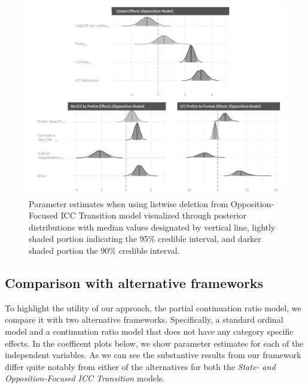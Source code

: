 \begin{figure}
    \centering
    \includegraphics[width=1\textwidth]{rebelCoefSumm_noImp.pdf}
    \caption{Parameter estimates when using listwise deletion from Opposition-Focused ICC Transition model visualized through posterior distributions with median values designated by vertical line, lightly shaded portion indicating the 95\% credible interval, and darker shaded portion the 90\% credible interval.}
    \label{fig:rebelModel_noImp}
\end{figure}

\FloatBarrier
\clearpage
\subsection*{Comparison with alternative frameworks}

To highlight the utility of our approach, the partial continuation ratio model, we compare it with two alternative frameworks. Specifically, a standard ordinal model and a continuation ratio model that does not have any category specific effects.  In the coefficent plots below, we show parameter estimates for each of the independent variables. As we can see the substantive results from our framework differ quite notably from either of the alternatives for both the \emph{State- and Opposition-Focused ICC Transition} models.

